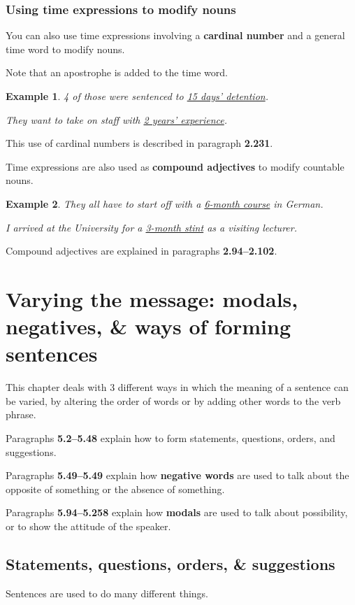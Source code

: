 \documentclass[oneside]{book}
\numberwithin{equation}{section}
\newtheorem{example}{Example}[section]
\begin{document}
\subsection{Using time expressions to modify nouns}
\noindent{} You can also use time expressions involving a \textbf{cardinal number} and a general time word to modify nouns.

Note that an apostrophe is added to the time word.
\begin{example}
    4 of those were sentenced to \underline{15 days' detention}.
    
    They want to take on staff with \underline{2 years' experience}.
\end{example}
This use of cardinal numbers is described in paragraph \textbf{2.231}.

%
\noindent{} Time expressions are also used as \textbf{compound adjectives} to modify countable nouns.
\begin{example}
    They all have to start off with a \underline{6-month course} in German.
    
    I arrived at the University for a \underline{3-month stint} as a visiting lecturer.
\end{example}
Compound adjectives are explained in paragraphs \textbf{2.94--2.102}.


\chapter{Varying the message: modals, negatives, \& ways of forming sentences}

\noindent{} This chapter deals with 3 different ways in which the meaning of a sentence can be varied, by altering the order of words or by adding other words to the verb phrase.

%
Paragraphs \textbf{5.2--5.48} explain how to form statements, questions, orders, and suggestions.

%
Paragraphs \textbf{5.49--5.49} explain how \textbf{negative words} are used to talk about the opposite of something or the absence of something.

%
Paragraphs \textbf{5.94--5.258} explain how \textbf{modals} are used to talk about possibility, or to show the attitude of the speaker.

\section{Statements, questions, orders, \& suggestions}
\noindent{} Sentences are used to do many different things.
\end{document}
